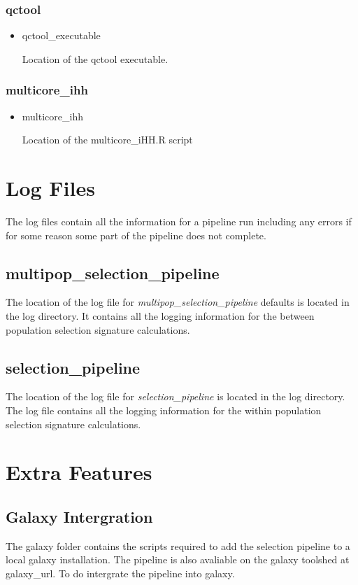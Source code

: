 \documentclass[a4paper,10pt]{article}
\begin{document}
\subsubsection{qctool}
\begin{itemize}
\item qctool\_executable

Location of the qctool executable.
\end{itemize}
\subsubsection{multicore\_ihh}
\begin{itemize}
\item multicore\_ihh

Location of the multicore\_iHH.R script



\end{itemize}
\section{Log Files}
The log files contain all the information for a pipeline run including any errors if for some reason some part of the pipeline does not complete.
\subsection{multipop\_selection_pipeline}
The location of the log file for  \emph{multipop\_selection_pipeline} defaults is
located in the log directory. It contains all the logging information
for the between population selection signature calculations.

\subsection{selection\_pipeline}
The location of the log file for \emph{selection\_pipeline} is located
in the log directory. The log file contains all the logging
information for the within population selection signature
calculations.

\section{Extra Features}

\subsection{Galaxy Intergration}
The galaxy folder contains the scripts required to add the selection
pipeline to a local galaxy installation. The pipeline is also
avaliable on the galaxy toolshed at galaxy\_url. To do intergrate the
pipeline into galaxy.
\end{document}
